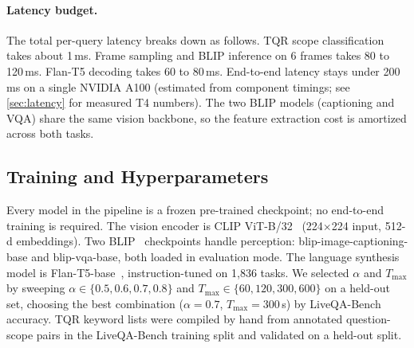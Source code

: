 \paragraph{Latency budget.}
The total per-query latency breaks down as follows. TQR scope classification takes about 1\,ms. Frame sampling and BLIP inference on 6 frames takes 80 to 120\,ms. Flan-T5 decoding takes 60 to 80\,ms.
End-to-end latency stays under 200\,ms on a single NVIDIA A100 (estimated from component timings; see \cref{sec:latency} for measured T4 numbers). The two BLIP models (captioning and VQA) share the same vision backbone, so the feature extraction cost is amortized across both tasks.


\subsection{Training and Hyperparameters}
\label{sec:training}

Every model in the pipeline is a frozen pre-trained checkpoint; no end-to-end training is required.
The vision encoder is CLIP ViT-B/32~\cite{radford2021clip} (224$\times$224 input, 512-d embeddings).
Two BLIP~\cite{li2022blip} checkpoints handle perception: blip-image-captioning-base and blip-vqa-base, both loaded in evaluation mode.
The language synthesis model is Flan-T5-base~\cite{chung2022flanT5}, instruction-tuned on 1,836 tasks.
We selected $\alpha$ and $T_{\max}$ by sweeping $\alpha \in \{0.5, 0.6, 0.7, 0.8\}$ and $T_{\max} \in \{60, 120, 300, 600\}$ on a held-out set, choosing the best combination ($\alpha = 0.7$, $T_{\max} = 300$\,s) by LiveQA-Bench accuracy.
TQR keyword lists were compiled by hand from annotated question-scope pairs in the LiveQA-Bench training split and validated on a held-out split.
